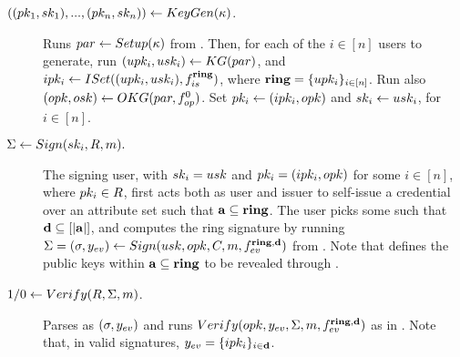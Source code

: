

\begin{description}
\item[$((pk_1,sk_1),...,(pk_n,sk_n)) \gets KeyGen(\kappa)$.] Runs
  $par \gets Setup(\kappa)$ from \CUASGenHideIss. Then, for each of
  the $i \in [n]$ users to generate, run $(upk_i,usk_i) \gets KG(par)$,
  and $ipk_i \gets ISet((upk_i,usk_i),f_{is}^{\mathbf{ring}})$, where $\mathbf{ring} =
  \lbrace upk_i \rbrace_{i\in[n]}$. Run also $(opk,osk) \gets OKG(par,
  f_{op}^0)$. Set $pk_i \gets (ipk_i,opk)$ and $sk_i \gets usk_i$, for
  $i\in[n]$.
\item[$\Sigma \gets Sign(sk_i,R,m).$]
  The signing user, with $sk_i=usk$ and $pk_i=(ipk_i,opk)$ for some $i \in
  [n]$, where $pk_i \in R$, first acts both as user and issuer to self-issue a
  credential \Cred over an attribute set \attrs such that $\mathbf{a} \subseteq
  \mathbf{ring}$. The user picks some \dattrs such that $\mathbf{d} \subseteq [|\mathbf{a}|]$,
  and computes the ring signature by running $\Sigma = (\sigma,y_{ev}) \gets
  Sign(usk,opk,C,m,f_{ev}^{\mathbf{ring},\mathbf{d}})$ from
  \CUASGenHideIss. Note that \dattrs defines the public keys within
  $\mathbf{a} \subseteq \mathbf{ring}$ to be revealed through \yeval.
\item[$1/0 \gets Verify(R,\Sigma,m)$.] Parses \Sig as $(\sigma,y_{ev})$ and
  runs $Verify(opk,y_{ev},\Sigma,m,f_{ev}^{\mathbf{ring},\mathbf{d}})$ as in
  \CUASGenHideIss. Note that, in valid signatures, $y_{ev} = \lbrace
  ipk_i\rbrace_{i\in\mathbf{d}}$.
\end{description}

